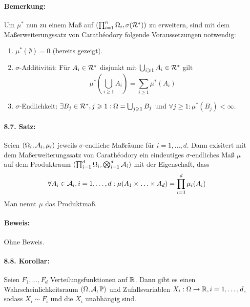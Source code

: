 \documentclass[11pt]{report}
\begin{document}
\paragraph{Bemerkung:}Um $\mu^*$ nun zu einem Ma\ss{} auf $(\prod_{i=1}^n\Omega_i,\sigma(\mathcal{R}^*))$ zu erweitern, sind mit dem Ma\ss{}erweiterungssatz von Carath\'eodory folgende Voraussetzungen notwendig:
\begin{enumerate}[label=(\roman*)]
    \item $\mu^*(\emptyset)=0$ (bereits gezeigt).
    \item $\sigma$-Additivit\"at: F\"ur $A_i\in\mathcal{R}^*$ disjunkt mit $\bigcup_{i\geqslant1}A_i\in\mathcal{R}^*$ gilt 
    $$\mu^*\left(\bigcup_{i\geq1}A_i\right)=\sum_{i\geq1}\mu^*(A_i)$$
    \item $\sigma$-Endlichkeit: $\exists B_j\in\mathcal{R}^*,j\geqslant1:\Omega=\bigcup_{j\geqslant1}B_j$ und $\forall j\geq1:\mu^*(B_j)<\infty$.
\end{enumerate}


\paragraph{8.7. Satz:}Seien $(\Omega_i,\mathcal{A}_i,\mu_i)$ jeweils $\sigma$-endliche Ma\ss{}r\"aume f\"ur $i=1,\hdots,d$. Dann exisitert mit dem Ma\ss{}erweiterungssatz von Carath\'eodory ein eindeutiges $\sigma$-endliches Ma\ss{} $\mu$ auf dem Produktraum $(\prod_{i=1}^d\Omega_i,\bigotimes_{i=1}^d\mathcal{A}_i)$ mit der Eigenschaft, dass
$$\forall A_i\in\mathcal{A}_i,i=1,\hdots,d:\mu(A_1\times\hdots\times A_d)=\prod_{i=1}^d\mu_i(A_i)$$
Man nennt $\mu$ das Produktma\ss{}.

\paragraph{Beweis:}Ohne Beweis. %

\paragraph{8.8. Korollar:}Seien $F_1,\hdots,F_d$ Verteilungsfunktionen auf $\mathbb{R}$. Dann gibt es einen Wahrscheinlichkeitsraum $(\Omega, \mathcal{A}, \mathbb{P})$ und Zufallsvariablen $X_i:\Omega\to\mathbb{R},i=1,\hdots,d$, sodass $X_i\sim F_i$ und die $X_i$ unabh\"angig sind.
\end{document}
